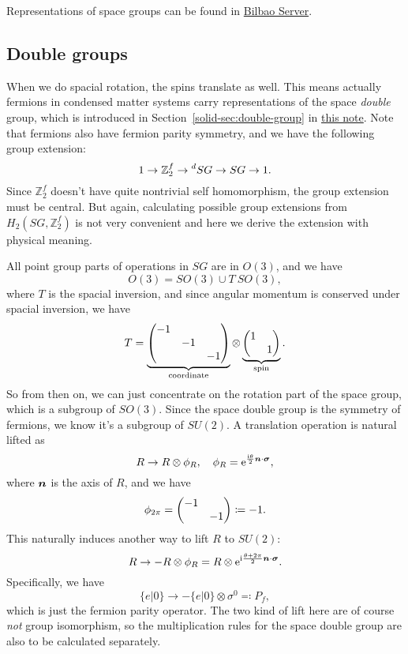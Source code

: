\documentclass[hyperref, a4paper]{article}
\newcommand*{\ii}{\mathrm{i}}
\newcommand*{\ee}{\mathrm{e}}
\newcommand{\soliddoc}{\href{../solid/solid.pdf}{this note}}
\begin{document}
Representations of space groups can be found in \href{https://www.cryst.ehu.es/}{Bilbao Server}. 

\subsection{Double groups}

When we do spacial rotation, the spins translate as well. This means actually fermions in condensed matter 
systems carry representations of the space \emph{double} group, which is introduced in 
Section~\ref{solid-sec:double-group} in \soliddoc. Note that fermions also have fermion parity symmetry, 
and we have the following group extension:
\begin{equation}
    1 \to \mathbb{Z}_2^f \to \prescript{d}{}{SG} \to SG \to 1.
\end{equation}
Since $\mathbb{Z}_2^f$ doesn't have quite nontrivial self homomorphism, the group extension must be central.
But again, calculating possible group extensions from $H_2(SG, \mathbb{Z}_2^f)$ is not very convenient 
and here we derive the extension with physical meaning.

All point group parts of operations in $SG$ are in $O(3)$, and we have 
\begin{equation}
    O(3) = SO(3) \cup T \ SO(3),
\end{equation}
where $T$ is the spacial inversion, and since angular momentum is conserved under spacial inversion, 
we have 
\begin{equation}
    T = \underbrace{\pmqty{\dmat{-1, -1, -1}}}_{\text{coordinate}} \otimes \underbrace{\pmqty{\dmat{1, 1}}}_\text{spin}.
\end{equation}
So from then on, we can just concentrate on the rotation part of the space group, which is a subgroup of $SO(3)$.
Since the space double group is the symmetry of fermions, we know it's a subgroup of $SU(2)$.
A translation operation is natural lifted as 
\begin{equation}
    R \to R \otimes \phi_R, \quad \phi_R = \ee^{\frac{\ii \theta}{2} \vb*{n} \cdot \vb*{\sigma}},
    \label{eq:double-lift-1}
\end{equation}
where $\vb*{n}$ is the axis of $R$, and we have 
\begin{equation}
    \phi_{2\pi} = \pmqty{\dmat{-1, -1}} \coloneqq -1.
\end{equation}
This naturally induces another way to lift $R$ to $SU(2)$: 
\begin{equation}
    R \to - R \otimes \phi_R = R \otimes \ee^{\ii \frac{\theta + 2\pi}{2} \vb*{n} \cdot \vb*{\sigma}}.
    \label{eq:double-lift-2}
\end{equation}
Specifically, we have 
\begin{equation}
    \{ e | 0 \} \to - \{ e | 0 \} \otimes \sigma^0 \eqqcolon P_f,
\end{equation}
which is just the fermion parity operator. The two kind of lift here are of course \emph{not} group isomorphism,
so the multiplication rules for the space double group are also to be calculated separately.
\end{document}
